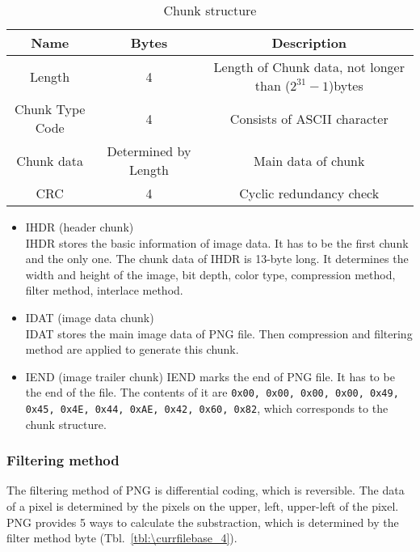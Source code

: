 \documentclass[catalog.tex]{subfiles}
\begin{document}
\begin{enumerate}
		\begin{table}[!htb]
			\caption{Chunk structure}
			\label{tbl:\currfilebase_3}
			\centering
			\begin{tabular}{ccc}
				\toprule
				Name & Bytes & Description \\
				\midrule
			  Length & 4 & Length of Chunk data, not longer than ($2^{31}-1$)bytes \\
				\midrule
				Chunk Type Code & 4 & Consists of ASCII character \\
				\midrule
				Chunk data & Determined by Length & Main data of chunk \\
				\midrule
				CRC & 4 & Cyclic redundancy check\\
				\bottomrule
			\end{tabular}
		\end{table}


		\begin{itemize}
			\item IHDR (header chunk)\\
			IHDR stores the basic information of image data. It has to be the first chunk and the only one. The chunk data of IHDR is 13-byte long. It determines the width and height of the image, bit depth, color type, compression method, filter method, interlace method.
			\item IDAT (image data chunk)\\
			IDAT stores the main image data of PNG file. Then compression and filtering method are applied to generate this chunk.
			\item IEND (image trailer chunk)
			IEND marks the end of PNG file. It has to be the end of the file. The contents of it are {\tt 0x00, 0x00, 0x00, 0x00, 0x49, 0x45, 0x4E, 0x44, 0xAE, 0x42, 0x60, 0x82}, which corresponds to the chunk structure.
		\end{itemize}
	\end{enumerate}


	\subsubsection*{Filtering method\cite{Ch.9}}
	The filtering method of PNG is differential coding, which is reversible. The data of a pixel is determined by the pixels on the upper, left, upper-left of the pixel. PNG provides 5 ways to calculate the substraction, which is determined by the filter method byte (Tbl.~\ref{tbl:\currfilebase_4}).
\end{document}
